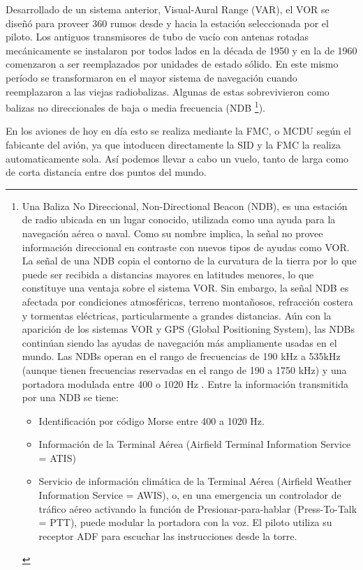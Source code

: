 Desarrollado de un sistema anterior, Visual-Aural Range (VAR), el VOR se dise\~n\'o para proveer 360 rumos desde y hacia la estaci\'on seleccionada por el piloto. Los antiguos transmisores de tubo de vac\'io con antenas rotadas mec\'anicamente se instalaron por todos lados en la d\'ecada de 1950 y en la de 1960 comenzaron a ser reemplazados por unidades de estado s\'olido. En este mismo per\'iodo se transformaron en el mayor sistema de navegaci\'on cuando reemplazaron a las viejas radiobalizas. Algunas de estas sobrevivieron como balizas no direccionales de baja o media frecuencia (NDB \footnote{Una Baliza No Direccional,  Non-Directional Beacon (NDB), es una estaci\'on de radio ubicada en un lugar conocido, utilizada como una ayuda para la navegaci\'on a\'erea o naval. Como su nombre implica, la se\~nal no provee informaci\'on direccional en contraste con nuevos tipos de ayudas como VOR. La se\~nal de una NDB copia el contorno de la curvatura de la tierra por lo que puede ser recibida a distancias mayores en latitudes menores, lo que constituye una ventaja sobre el sistema VOR. Sin embargo, la se\~nal NDB es afectada por condiciones atmosf\'ericas, terreno monta\~nosos, refracci\'on costera y tormentas el\'ectricas, particularmente a grandes distancias. A\'un con la aparici\'on de los sistemas VOR y GPS (Global Positioning System), las NDBs contin\'uan siendo las ayudas de navegaci\'on m\'as ampliamente usadas en el mundo. Las NDBs operan en el rango de frecuencias de 190 kHz a 535kHz (aunque tienen frecuencias reservadas en el rango de 190 a 1750 kHz) y una portadora modulada entre  400 o 1020 Hz \cite{NDB}. Entre la informaci\'on transmitida por una NDB se tiene:

\begin{itemize}
 \item Identificaci\'on por c\'odigo Morse entre 400 a 1020 Hz.
\item Informaci\'on de la Terminal A\'erea (Airfield Terminal Information Service = ATIS)
\item Servicio de informaci\'on clim\'atica de la Terminal A\'erea (Airfield Weather Information Service = AWIS), o, en una emergencia un controlador de tr\'afico a\'ereo activando la funci\'on de Presionar-para-hablar (Press-To-Talk = PTT), puede modular la portadora con la voz. El piloto utiliza su receptor ADF para escuchar las instrucciones desde la torre.
\end{itemize}
}).

En los aviones de hoy en d\'ia esto se realiza mediante la FMC, o MCDU seg\'un el fabicante del avi\'on, ya que intoducen directamente la SID y la FMC la realiza automaticamente sola. As\'i podemos llevar a cabo un vuelo, tanto de larga como de corta distancia entre dos puntos del mundo.

